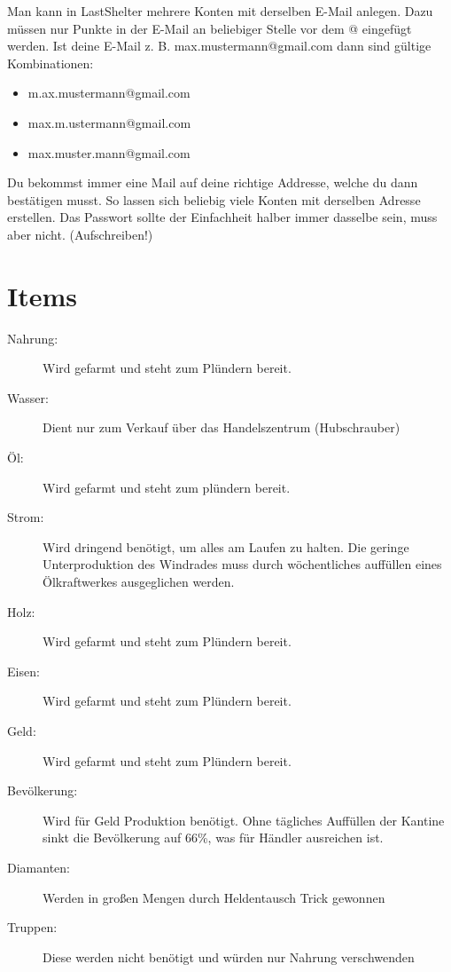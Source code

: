 \documentclass[fontsize=12pt,a4paper,draft]{scrartcl}[2003/01/01]
\begin{document}
Man kann in LastShelter mehrere Konten mit derselben E-Mail anlegen. Dazu müssen nur Punkte in der E-Mail an beliebiger Stelle vor dem @ eingefügt werden.
Ist deine E-Mail z. B. max.mustermann@gmail.com dann sind gültige Kombinationen: 
\begin{itemize}
  \item m.ax.mustermann@gmail.com
  \item max.m.ustermann@gmail.com
  \item max.muster.mann@gmail.com
\end{itemize}	

Du bekommst immer eine Mail auf deine richtige Addresse, welche du dann bestätigen musst.
So lassen sich beliebig viele Konten mit derselben Adresse erstellen. Das Passwort sollte der Einfachheit halber immer dasselbe sein, muss aber nicht. (Aufschreiben!)


\section{Items}

\begin{description}
  \item[Nahrung:] Wird gefarmt und steht zum Plündern bereit.
  \item[Wasser:] Dient nur zum Verkauf über das Handelszentrum (Hubschrauber)
  \item[Öl:] Wird gefarmt und steht zum plündern bereit.
  \item[Strom:] Wird dringend benötigt, um alles am Laufen zu halten. Die geringe Unterproduktion des Windrades muss durch wöchentliches auffüllen eines Ölkraftwerkes ausgeglichen werden.
  \item[Holz:] Wird gefarmt und steht zum Plündern bereit.
  \item[Eisen:] Wird gefarmt und steht zum Plündern bereit.
  \item[Geld:] Wird gefarmt und steht zum Plündern bereit.
  \item[Bevölkerung:] Wird für Geld Produktion benötigt. Ohne tägliches Auffüllen der Kantine sinkt die Bevölkerung auf 66\%, was für Händler ausreichen ist.
  \item[Diamanten:] Werden in großen Mengen durch Heldentausch Trick gewonnen
  \item[Truppen:] Diese werden nicht benötigt und würden nur Nahrung verschwenden
\end{description}
\end{document}
